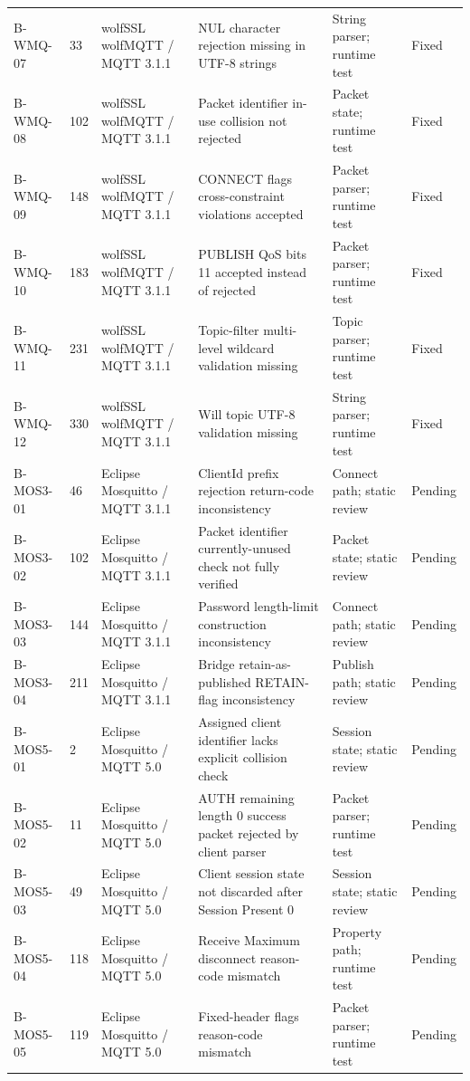 \begin{table}[p]
\begin{tabular}{p{}p{}p{}p{}p{}p{}}
B-WMQ-07 & 33 & wolfSSL wolfMQTT / MQTT 3.1.1 & NUL character rejection missing in UTF-8 strings & String parser; runtime test & Fixed \\
B-WMQ-08 & 102 & wolfSSL wolfMQTT / MQTT 3.1.1 & Packet identifier in-use collision not rejected & Packet state; runtime test & Fixed \\
B-WMQ-09 & 148 & wolfSSL wolfMQTT / MQTT 3.1.1 & CONNECT flags cross-constraint violations accepted & Packet parser; runtime test & Fixed \\
B-WMQ-10 & 183 & wolfSSL wolfMQTT / MQTT 3.1.1 & PUBLISH QoS bits 11 accepted instead of rejected & Packet parser; runtime test & Fixed \\
B-WMQ-11 & 231 & wolfSSL wolfMQTT / MQTT 3.1.1 & Topic-filter multi-level wildcard validation missing & Topic parser; runtime test & Fixed \\
B-WMQ-12 & 330 & wolfSSL wolfMQTT / MQTT 3.1.1 & Will topic UTF-8 validation missing & String parser; runtime test & Fixed \\
B-MOS3-01 & 46 & Eclipse Mosquitto / MQTT 3.1.1 & ClientId prefix rejection return-code inconsistency & Connect path; static review & Pending \\
B-MOS3-02 & 102 & Eclipse Mosquitto / MQTT 3.1.1 & Packet identifier currently-unused check not fully verified & Packet state; static review & Pending \\
B-MOS3-03 & 144 & Eclipse Mosquitto / MQTT 3.1.1 & Password length-limit construction inconsistency & Connect path; static review & Pending \\
B-MOS3-04 & 211 & Eclipse Mosquitto / MQTT 3.1.1 & Bridge retain-as-published RETAIN-flag inconsistency & Publish path; static review & Pending \\
B-MOS5-01 & 2 & Eclipse Mosquitto / MQTT 5.0 & Assigned client identifier lacks explicit collision check & Session state; static review & Pending \\
B-MOS5-02 & 11 & Eclipse Mosquitto / MQTT 5.0 & AUTH remaining length 0 success packet rejected by client parser & Packet parser; runtime test & Pending \\
B-MOS5-03 & 49 & Eclipse Mosquitto / MQTT 5.0 & Client session state not discarded after Session Present 0 & Session state; static review & Pending \\
B-MOS5-04 & 118 & Eclipse Mosquitto / MQTT 5.0 & Receive Maximum disconnect reason-code mismatch & Property path; runtime test & Pending \\
B-MOS5-05 & 119 & Eclipse Mosquitto / MQTT 5.0 & Fixed-header flags reason-code mismatch & Packet parser; runtime test & Pending \\

\end{tabular}
\end{table}

